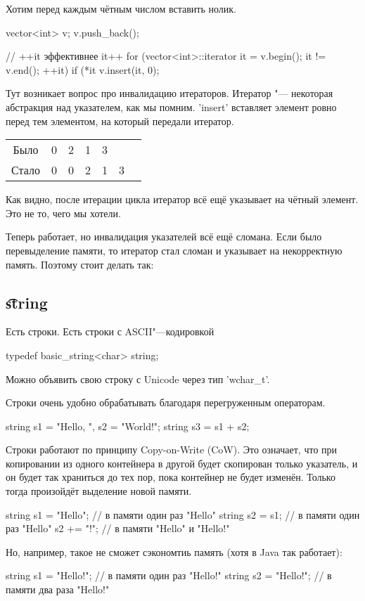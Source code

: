 
Хотим перед каждым чётным числом вставить нолик.
\begin{cppcode}
vector<int> v;
v.push_back();

// ++it эффективнее it++
for (vector<int>::iterator it = v.begin(); it != v.end(); ++it) {
	if (*it %
		v.insert(it, 0);
}
\end{cppcode}
Тут возникает вопрос про инвалидацию итераторов.
Итератор "--- некоторая абстракция над указателем, как мы помним.
\cpp'insert' вставляет элемент ровно перед тем элементом, на который передали итератор.
\begin{center}
\begin{tabular}{c|cccccc}
Было  & 0 & 2 & 1 & 3 & \\
Стало & 0 & 0 & 2 & 1 & 3
\end{tabular}
\end{center}
Как видно, после итерации цикла итератор всё ещё указывает на чётный элемент. Это не то, чего мы хотели.
Теперь работает, но инвалидация указателей всё ещё сломана.
Если было перевыделение памяти, то итератор стал сломан и указывает на некорректную память. Поэтому стоит делать так:

\subsection{\t{string}}

Есть строки. Есть строки с ASCII"---кодировкой
\begin{cppcode}
typedef basic_string<char> string;
\end{cppcode}
Можно объявить свою строку с Unicode через тип \cpp'wchar_t'.

Строки очень удобно обрабатывать благодаря перегруженным операторам.
\begin{cppcode}
string s1 = "Hello, ", s2 = "World!";
string s3 = s1 + s2;
\end{cppcode}

Строки работают по принципу Copy-on-Write (CoW).
Это означает, что при копировании из одного контейнера в другой будет скопирован только указатель,
и он будет так храниться до тех пор, пока контейнер не будет изменён.
Только тогда произойдёт выделение новой памяти.
\begin{cppcode}
string s1 = "Hello"; // в памяти один раз "Hello"
string s2 = s1; // в памяти один раз "Hello"
s2 += "!"; // в памяти "Hello" и "Hello!"
\end{cppcode}
Но, например, такое не сможет сэкономтиь память (хотя в Java так работает):
\begin{cppcode}
string s1 = "Hello!"; // в памяти один раз "Hello!"
string s2 = "Hello!"; // в памяти два раза "Hello!"
\end{cppcode}


